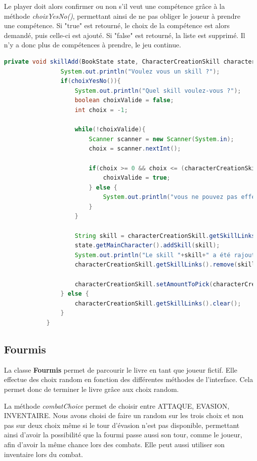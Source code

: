 		Le player doit alors confirmer ou non s'il veut une compétence grâce à la méthode \textit{choixYesNo()}, permettant ainsi de ne pas obliger le joueur à prendre une compétence. Si "true" est retourné, le choix de la compétence est alors demandé, puis celle-ci est ajouté. Si "false" est retourné, la liste est supprimé. Il n'y a donc plus de compétences à prendre, le jeu continue.

		\begin{lstlisting}[gobble=12, language=java, caption=skillAdd()]
			private void skillAdd(BookState state, CharacterCreationSkill characterCreationSkill){
				System.out.println("Voulez vous un skill ?");
				if(choixYesNo()){
					System.out.println("Quel skill voulez-vous ?");
					boolean choixValide = false;
					int choix = -1;

					while(!choixValide){
						Scanner scanner = new Scanner(System.in);
						choix = scanner.nextInt();

						if(choix >= 0 && choix <= (characterCreationSkill.getSkillLinks().size()-1)){
							choixValide = true;
						} else {
							System.out.println("vous ne pouvez pas effectuer ce choix");
						}
					}

					String skill = characterCreationSkill.getSkillLinks().get(choix);
					state.getMainCharacter().addSkill(skill);
					System.out.println("Le skill "+skill+" a été rajouté");
					characterCreationSkill.getSkillLinks().remove(skill);

					characterCreationSkill.setAmountToPick(characterCreationSkill.getAmountToPick()-1);
				} else {
					characterCreationSkill.getSkillLinks().clear();
				}
			}
			\end{lstlisting}



	\subsection{Fourmis}\label{sub:fourmis}
		La classe \textbf{Fourmis} permet de parcourir le livre en tant que joueur fictif. Elle effectue des choix random en fonction des différentes méthodes de l'interface. Cela permet donc de terminer le livre grâce aux choix random.

		La méthode \textit{combatChoice} permet de choisir entre ATTAQUE, EVASION, INVENTAIRE. Nous avons choisi de faire un random sur les trois choix et non pas sur deux choix même si le tour d'évasion n'est pas disponible, permettant ainsi d'avoir la possibilité que la fourmi passe aussi son tour, comme le joueur, afin d'avoir la même chance lors des combats. Elle peut aussi utiliser son inventaire lors du combat.

